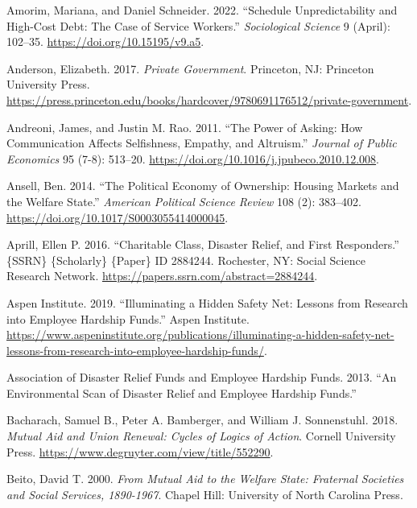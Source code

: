 \documentclass[
  11pt,
  oneside]{article}
\newlength{\cslhangindent}
\newenvironment{CSLReferences}[2] %
 {\begin{list}{}{%
  \setlength{\itemindent}{0pt}
  \setlength{\leftmargin}{0pt}
  \setlength{\parsep}{0pt}
  \ifodd #1
   \setlength{\leftmargin}{\cslhangindent}
   \setlength{\itemindent}{-1\cslhangindent}
  \fi
  \setlength{\itemsep}{#2\baselineskip}}}
 {\end{list}}
\begin{document}
\begin{CSLReferences}{1}{0}
Amorim, Mariana, and Daniel Schneider. 2022. {``Schedule {Unpredictability} and {High}-{Cost} {Debt}: {The} {Case} of {Service} {Workers}.''} \emph{Sociological Science} 9 (April): 102--35. \url{https://doi.org/10.15195/v9.a5}.

Anderson, Elizabeth. 2017. \emph{Private {Government}}. Princeton, NJ: Princeton University Press. \url{https://press.princeton.edu/books/hardcover/9780691176512/private-government}.

Andreoni, James, and Justin M. Rao. 2011. {``The Power of Asking: {How} Communication Affects Selfishness, Empathy, and Altruism.''} \emph{Journal of Public Economics} 95 (7-8): 513--20. \url{https://doi.org/10.1016/j.jpubeco.2010.12.008}.

Ansell, Ben. 2014. {``The {Political} {Economy} of {Ownership}: {Housing} {Markets} and the {Welfare} {State}.''} \emph{American Political Science Review} 108 (2): 383--402. \url{https://doi.org/10.1017/S0003055414000045}.

Aprill, Ellen P. 2016. {``Charitable {Class}, {Disaster} {Relief}, and {First} {Responders}.''} \{SSRN\} \{Scholarly\} \{Paper\} ID 2884244. Rochester, NY: Social Science Research Network. \url{https://papers.ssrn.com/abstract=2884244}.

Aspen Institute. 2019. {``Illuminating a {Hidden} {Safety} {Net}: {Lessons} from {Research} into {Employee} {Hardship} {Funds}.''} Aspen Institute. \url{https://www.aspeninstitute.org/publications/illuminating-a-hidden-safety-net-lessons-from-research-into-employee-hardship-funds/}.

Association of Disaster Relief Funds and Employee Hardship Funds. 2013. {``An {Environmental} {Scan} of {Disaster} {Relief} and {Employee} {Hardship} {Funds}.''}

Bacharach, Samuel B., Peter A. Bamberger, and William J. Sonnenstuhl. 2018. \emph{Mutual {Aid} and {Union} {Renewal}: {Cycles} of {Logics} of {Action}}. Cornell University Press. \url{https://www.degruyter.com/view/title/552290}.

Beito, David T. 2000. \emph{From {Mutual} {Aid} to the {Welfare} {State}: {Fraternal} {Societies} and {Social} {Services}, 1890-1967}. Chapel Hill: University of North Carolina Press.


\end{CSLReferences}
\end{document}
